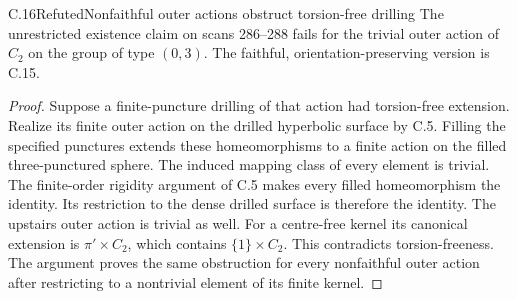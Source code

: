 \begin{claim}{C.16}{Refuted}{Nonfaithful outer actions obstruct torsion-free drilling}
The unrestricted existence claim on scans 286--288 fails for the
trivial outer action of $C_2$ on the group of type $(0,3)$. The faithful,
orientation-preserving version is C.15.
\end{claim}
\begin{proof}
Suppose a finite-puncture drilling of that action had torsion-free
extension. Realize its finite outer action on the drilled hyperbolic
surface by C.5. Filling the specified punctures extends these
homeomorphisms to a finite action on the filled three-punctured sphere.
The induced mapping class of every element is trivial. The finite-order
rigidity argument of C.5 makes every filled homeomorphism the identity.
Its restriction to the dense drilled surface is therefore the identity.
The upstairs outer action is trivial as well. For a centre-free kernel
its canonical extension is $\pi'\times C_2$, which contains
$\{1\}\times C_2$. This contradicts torsion-freeness. The argument proves
the same obstruction for every nonfaithful outer action after restricting
to a nontrivial element of its finite kernel.
\end{proof}

